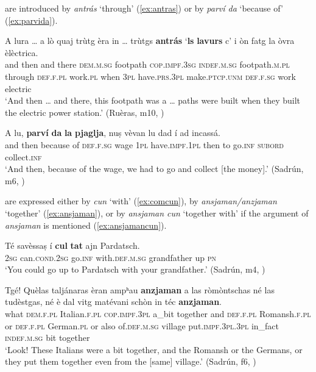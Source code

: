  are introduced by \textit{antrás} `through' (\ref{ex:antras}) or by \textit{parví da} `because of' (\ref{ex:parvida}).

\ea
\label{ex:antras}
\gll A lura … a lò quaj trùtg èra in … trùtgs \textbf{antrás} `\textbf{ls} \textbf{lavurs} c' i òn fatg la òvra èlèctrica.\\
and then {}  and there \textsc{dem.m.sg} footpath  \textsc{cop.impf.3sg} \textsc{indef.m.sg} {} footpath.\textsc{m.pl} through \textsc{def.f.pl}  work.\textsc{pl} when \textsc{3pl} have.\textsc{prs.3pl} make.\textsc{ptcp.unm} \textsc{def.f.sg} work electric \\
\glt `And then … and there, this footpath was a … paths were built when they built the electric power station.' (Ruèras, m10, )
\z

\ea
\label{ex:parvida}
\gll    A lu, \textbf{parví} \textbf{da} \textbf{la} \textbf{pjaglja}, nuṣ vèvan lu dad í ad incassá.\\
and then because of \textsc{def.f.sg} wage \textsc{1pl} have.\textsc{impf.1pl} then to go.\textsc{inf}  \textsc{subord} collect.\textsc{inf} \\
\glt `And then, because of the wage, we had to go and collect [the money].' (Sadrún, m6, )
\z

 are expressed either by \textit{cun} `with' (\ref{ex:comcun}), by \textit{ansjaman/an\-zja\-man} `together' (\ref{ex:ansjaman}), or by \textit{ansjaman cun} `together with' if the argument of \textit{ansjaman} is mentioned (\ref{ex:ansjamancun}).

\ea
\label{ex:comcun}
\gll Té savèssaṣ í \textbf{cul} \textbf{tat} ajn Pardatsch.  \\
 \textsc{2sg} can.\textsc{cond.2sg} go.\textsc{inf} with.\textsc{def.m.sg} grandfather up \textsc{pn}  \\
\glt `You could go up to Pardatsch with your grandfather.' (Sadrún, m4, )
\z

\ea
\label{ex:ansjaman}
\gll    Tgé! Quèlas taljánaras èran ampʰau \textbf{anzjaman} a las ròmòntschas né las tudèstgas, né è dal vitg matévani schòn in téc \textbf{anzjaman}.\\
what \textsc{dem.f.pl} Italian.\textsc{f.pl} \textsc{cop.impf.3pl} a\_bit together and \textsc{def\textbf{}.f.pl} Romansh.\textsc{f.pl} or  \textsc{def.f.pl} German.\textsc{pl} or also of.\textsc{def.m.sg} village put.\textsc{impf.3pl.3pl} in\_fact \textsc{indef.m.sg} bit together\\
\glt `Look! These Italians were a bit together, and the Romansh or the Germans, or they put them together even from the [same] village.' (Sadrún, f6, )
\z

